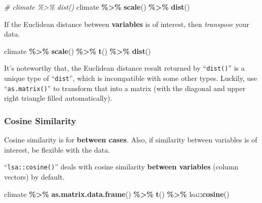 \documentclass[
]{ctexart}
\newenvironment{Shaded}{\begin{snugshade}}{\end{snugshade}}
\newcommand{\CommentTok}[1]{\textcolor[rgb]{0.56,0.35,0.01}{\textit{#1}}}
\newcommand{\FunctionTok}[1]{\textcolor[rgb]{0.13,0.29,0.53}{\textbf{#1}}}
\newcommand{\NormalTok}[1]{#1}
\newcommand{\SpecialCharTok}[1]{\textcolor[rgb]{0.81,0.36,0.00}{\textbf{#1}}}
\begin{document}
\begin{Shaded}
\begin{Highlighting}[]
\CommentTok{\# climate \%\textgreater{}\% dist()}
\NormalTok{climate  }\SpecialCharTok{\%\textgreater{}\%} 
  \FunctionTok{scale}\NormalTok{() }\SpecialCharTok{\%\textgreater{}\%} \FunctionTok{dist}\NormalTok{() }
\end{Highlighting}
\end{Shaded}

If the Euclidean distance between \textbf{variables} is of interest,
then \emph{transpose} your data.

\begin{Shaded}
\begin{Highlighting}[]
\NormalTok{climate  }\SpecialCharTok{\%\textgreater{}\%} 
  \FunctionTok{scale}\NormalTok{() }\SpecialCharTok{\%\textgreater{}\%} \FunctionTok{t}\NormalTok{() }\SpecialCharTok{\%\textgreater{}\%} \FunctionTok{dist}\NormalTok{()}
\end{Highlighting}
\end{Shaded}

It's noteworthy that, the Euclidean distance result returned by
``\texttt{dist()}'' is a unique type of ``\texttt{dist}'', which is
incompatible with some other types. Luckily, use
``\texttt{as.matrix()}'' to transform that into a matrix (with the
diagonal and upper right triangle filled automatically).

\hypertarget{cosine-similarity}{%
\subsubsection{Cosine Similarity}\label{cosine-similarity}}

Cosine similarity is for \textbf{between cases}. Also, if similarity
between variables is of interest, be flexible with the data.

``\texttt{lsa::cosine()}'' deals with cosine similarity \textbf{between
variables} (column vectors) by default.

\begin{Shaded}
\begin{Highlighting}[]
\NormalTok{climate }\SpecialCharTok{\%\textgreater{}\%} 
  \FunctionTok{as.matrix.data.frame}\NormalTok{() }\SpecialCharTok{\%\textgreater{}\%} \FunctionTok{t}\NormalTok{() }\SpecialCharTok{\%\textgreater{}\%} 
\NormalTok{  lsa}\SpecialCharTok{::}\FunctionTok{cosine}\NormalTok{()}
\end{Highlighting}
\end{Shaded}
\end{document}
